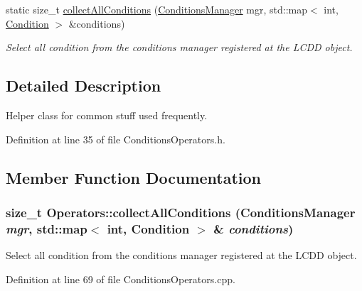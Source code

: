 \begin{DoxyCompactItemize}
static size\_\-t \hyperlink{class_d_d4hep_1_1_conditions_1_1_operators_a3e62b95a664418388b057e80d20f48b1}{collectAllConditions} (\hyperlink{class_d_d4hep_1_1_conditions_1_1_conditions_manager}{ConditionsManager} mgr, std::map$<$ int, \hyperlink{class_d_d4hep_1_1_conditions_1_1_condition}{Condition} $>$ \&conditions)
\begin{DoxyCompactList}\small\item\em Select all condition from the conditions manager registered at the LCDD object. \item\end{DoxyCompactList}\end{DoxyCompactItemize}


\subsection{Detailed Description}
Helper class for common stuff used frequently. 

Definition at line 35 of file ConditionsOperators.h.

\subsection{Member Function Documentation}
\hypertarget{class_d_d4hep_1_1_conditions_1_1_operators_a3e62b95a664418388b057e80d20f48b1}{
\subsubsection[{collectAllConditions}]{\setlength{\rightskip}{0pt plus 5cm}size\_\-t Operators::collectAllConditions ({\bf ConditionsManager} {\em mgr}, \/  std::map$<$ int, {\bf Condition} $>$ \& {\em conditions})}}
\label{class_d_d4hep_1_1_conditions_1_1_operators_a3e62b95a664418388b057e80d20f48b1}


Select all condition from the conditions manager registered at the LCDD object. 

Definition at line 69 of file ConditionsOperators.cpp.

